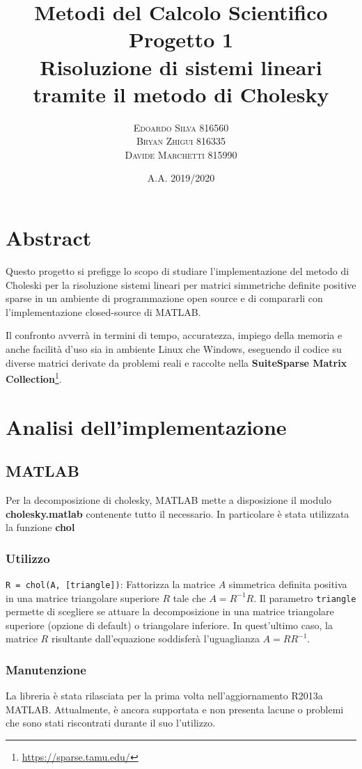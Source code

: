 \documentclass[11pt,italian]{article}
\title{
    Metodi del Calcolo Scientifico \\
    \normalsize Progetto 1 \\
    \normalsize Risoluzione di sistemi lineari tramite il metodo di Cholesky \\
}
\date{\small A.A. 2019/2020}
\author{
    \normalsize
    \textsc{Edoardo Silva} 816560 \\
    \normalsize
    \textsc{Bryan Zhigui} 816335 \\
    \normalsize
    \textsc{Davide Marchetti} 815990
}
\begin{document}
\maketitle

\section*{Abstract}
Questo progetto si prefigge lo scopo di studiare l'implementazione del metodo di Choleski per la risoluzione sistemi lineari per matrici simmetriche definite positive sparse in un ambiente di programmazione open source e di compararli con l'implementazione closed-source di MATLAB.

Il confronto avverrà in termini di tempo, accuratezza, impiego della memoria e anche facilità d'uso sia in ambiente Linux che Windows, eseguendo il codice su diverse matrici derivate da problemi reali e raccolte nella \textbf{SuiteSparse Matrix Collection}\footnote{\url{https://sparse.tamu.edu/}}.

\newpage
\section{Analisi dell'implementazione}

\subsection{MATLAB}
Per la decomposizione di cholesky, MATLAB mette a disposizione il modulo \textbf{cholesky.matlab} contenente tutto il necessario. In particolare è stata utilizzata la funzione \textbf{chol}

\subsubsection*{Utilizzo}
\lstinline{R = chol(A, [triangle])}: Fattorizza la matrice $A$ simmetrica definita positiva in una matrice triangolare superiore $R$ tale che $A=R^{-1}R$.
Il parametro \lstinline{triangle} permette di scegliere se attuare la decomposizione in una matrice triangolare superiore (opzione di default) o triangolare inferiore. In quest'ultimo caso, la matrice $R$ risultante dall'equazione soddisferà l'uguaglianza $A = RR^{-1}$.

\subsubsection*{Manutenzione}
La libreria è stata rilasciata per la prima volta nell'aggiornamento R2013a MATLAB. Attualmente, è ancora supportata e non presenta lacune o problemi che sono stati riscontrati durante il suo l'utilizzo.
\end{document}
